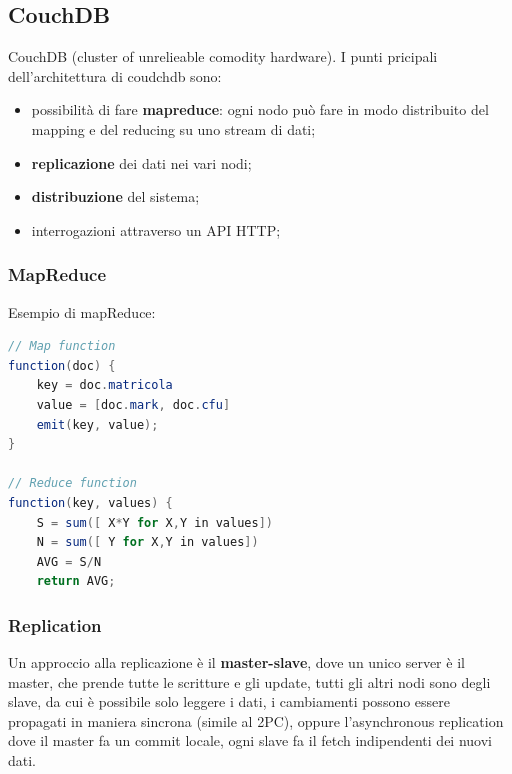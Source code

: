 \documentclass[12pt]{article}
\begin{document}
\subsection{CouchDB}
CouchDB (cluster of unrelieable comodity hardware). I punti pricipali dell'architettura di coudchdb sono:
\begin{itemize}
    \item possibilit\`a di fare \textbf{mapreduce}: ogni nodo pu\`o fare in modo distribuito del mapping e del reducing su uno stream di dati;
    \item \textbf{replicazione} dei dati nei vari nodi;
    \item \textbf{distribuzione} del sistema;
    \item interrogazioni attraverso un API HTTP;
\end{itemize}

\subsubsection{MapReduce}
Esempio di mapReduce:
\begin{lstlisting}[language=java]
// Map function
function(doc) {
    key = doc.matricola
    value = [doc.mark, doc.cfu]
    emit(key, value);
}

// Reduce function
function(key, values) {
    S = sum([ X*Y for X,Y in values])
    N = sum([ Y for X,Y in values])
    AVG = S/N
    return AVG;
\end{lstlisting}



\subsubsection{Replication}
Un approccio alla replicazione \`e il \textbf{master-slave}, dove un unico server \`e il master, che prende tutte le scritture e gli update, tutti gli altri nodi sono degli slave, da cui \`e possibile solo leggere i dati, i cambiamenti possono essere propagati in maniera sincrona (simile al 2PC), oppure l'asynchronous replication dove il master fa un commit locale, ogni slave fa il fetch indipendenti dei nuovi dati.
\end{document}

